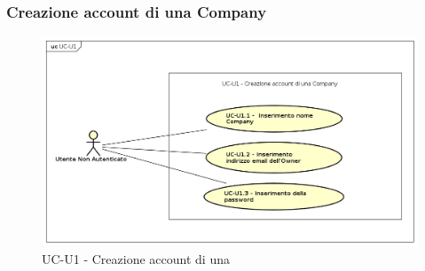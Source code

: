 \subsubsection{Creazione account di una Company}

    \begin{figure}[H]
      \begin{center}
        \includegraphics[width=12cm]{res/img/UCUtenti/UCUtenteNA/UC-U1-Creazione Account Azienda/UC-U1.png}
      \caption{UC-U1 - Creazione account di una }
      \end{center} 
    \end{figure}    
    
